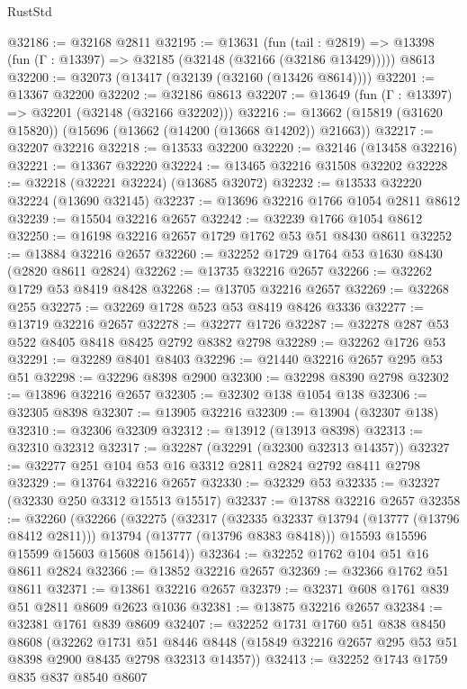 \begin{lexlean}{RustStd}
\begin{coremodule}
@32186 := @32168 @2811
@32195 := @13631
    (fun (tail : @2819) => @13398 (fun (Γ : @13397) => @32185 (@32148 (@32166 (@32186 @13429)))))
    @8613
@32200 := @32073 (@13417 (@32139 (@32160 (@13426 @8614))))
@32201 := @13367 @32200
@32202 := @32186 @8613
@32207 := @13649 (fun (Γ : @13397) => @32201 (@32148 (@32166 @32202)))
@32216 := @13662 (@15819 (@31620 @15820)) (@15696 (@13662 (@14200 (@13668 @14202)) @21663))
@32217 := @32207 @32216
@32218 := @13533 @32200
@32220 := @32146 (@13458 @32216)
@32221 := @13367 @32220
@32224 := @13465 @32216 @31508 @32202
@32228 := @32218 (@32221 @32224) (@13685 @32072)
@32232 := @13533 @32220 @32224 (@13690 @32145)
@32237 := @13696 @32216 @1766 @1054 @2811 @8612
@32239 := @15504 @32216 @2657
@32242 := @32239 @1766 @1054 @8612
@32250 := @16198 @32216 @2657 @1729 @1762 @53 @51 @8430 @8611
@32252 := @13884 @32216 @2657
@32260 := @32252 @1729 @1764 @53 @1630 @8430 (@2820 @8611 @2824)
@32262 := @13735 @32216 @2657
@32266 := @32262 @1729 @53 @8419 @8428
@32268 := @13705 @32216 @2657
@32269 := @32268 @255
@32275 := @32269 @1728 @523 @53 @8419 @8426 @3336
@32277 := @13719 @32216 @2657
@32278 := @32277 @1726
@32287 := @32278 @287 @53 @522 @8405 @8418 @8425 @2792 @8382 @2798
@32289 := @32262 @1726 @53
@32291 := @32289 @8401 @8403
@32296 := @21440 @32216 @2657 @295 @53 @51
@32298 := @32296 @8398 @2900
@32300 := @32298 @8390 @2798
@32302 := @13896 @32216 @2657
@32305 := @32302 @138 @1054 @138
@32306 := @32305 @8398
@32307 := @13905 @32216
@32309 := @13904 (@32307 @138)
@32310 := @32306 @32309
@32312 := @13912 (@13913 @8398)
@32313 := @32310 @32312
@32317 := @32287 (@32291 (@32300 @32313 @14357))
@32327 := @32277 @251 @104 @53 @16 @3312 @2811 @2824 @2792 @8411 @2798
@32329 := @13764 @32216 @2657
@32330 := @32329 @53
@32335 := @32327 (@32330 @250 @3312 @15513 @15517)
@32337 := @13788 @32216 @2657
@32358 := @32260
    (@32266
      (@32275
        (@32317
          (@32335 @32337 @13794 (@13777 (@13796 @8412 @2811)))
          @13794
          (@13777 (@13796 @8383 @8418)))
        @15593
        @15596
        @15599
        @15603
        @15608
        @15614))
@32364 := @32252 @1762 @104 @51 @16 @8611 @2824
@32366 := @13852 @32216 @2657
@32369 := @32366 @1762 @51 @8611
@32371 := @13861 @32216 @2657
@32379 := @32371 @608 @1761 @839 @51 @2811 @8609 @2623 @1036
@32381 := @13875 @32216 @2657
@32384 := @32381 @1761 @839 @8609
@32407 := @32252
    @1731
    @1760
    @51
    @838
    @8450
    @8608
    (@32262
      @1731
      @51
      @8446
      @8448
      (@15849 @32216 @2657 @295 @53 @51 @8398 @2900 @8435 @2798 @32313 @14357))
@32413 := @32252 @1743 @1759 @835 @837 @8540 @8607

\end{coremodule}
\end{lexlean}
